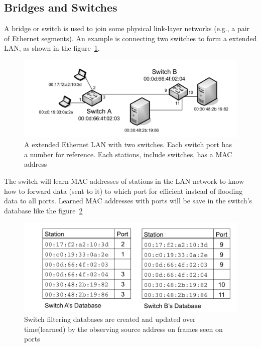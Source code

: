 \documentclass[a4paper, 11pt]{article}
\begin{document}
\subsection{Bridges and Switches}

A bridge or switch is used to join some physical link-layer networks (e.g., a pair of Ethernet segments). An example is connecting two switches to form a extended LAN, as shown in the figure~\ref{fig:extend-LAN}.

\begin{figure}[h]
\includegraphics[scale=0.6]{extended-LAN.png}
\caption{A extended Ethernet LAN with two switches. Each switch port has a number for reference. Each stations, include switches, has a MAC address}
\label{fig:extend-LAN}
\end{figure}

The switch will learn MAC addresses of stations in the LAN network to know how to forward data (sent to it) to which port for efficient instead of flooding data to all ports. Learned MAC addresses with ports will be save in the switch's database like the figure~\ref{fig:switch-database}

\begin{figure}[h]
\includegraphics[scale=0.6]{switch-database.png}
\caption{Switch filtering databases are created and updated over time(learned) by the observing source address on frames seen on ports}
\label{fig:switch-database}
\end{figure}
\end{document}
